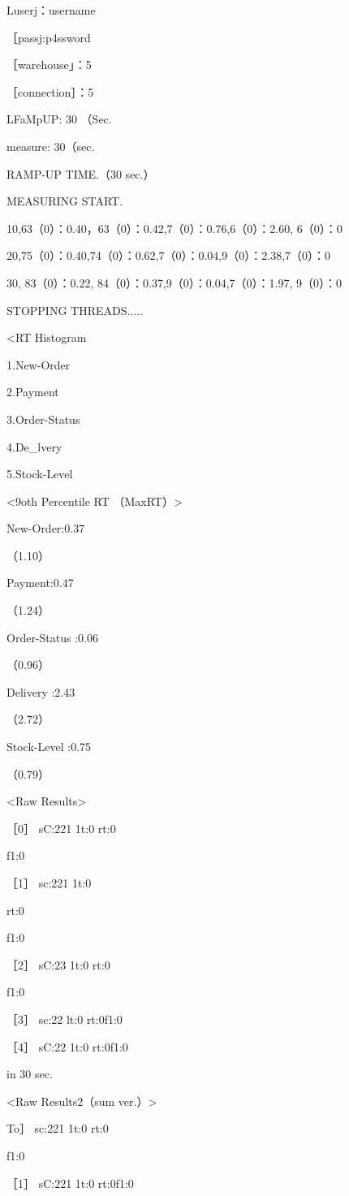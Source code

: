 Luserj：username

［passj:p4ssword

［warehouse」：5

［connection］：5

LFaMpUP: 30 （Sec.

measure: 30（sec.

RAMP-UP TIME.（30 sec.）

MEASURING START.

10,63（0）：0.40，63（0）：0.42,7（0）：0.76,6（0）：2.60, 6（0）：0

20,75（0）：0.40,74（0）：0.62,7（0）：0.04,9（0）：2.38,7（0）：0

30, 83（0）：0.22, 84（0）：0.37,9（0）：0.04,7（0）：1.97, 9（0）：0

STOPPING THREADS.....

<RT Histogram

1.New-Order

2.Payment

3.Order-Status

4.De\_lvery

5.Stock-Level

<9oth Percentile RT （MaxRT）>

New-Order:0.37

（1.10）

Payment:0.47

（1.24）

Order-Status :0.06

（0.96）

Delivery :2.43

（2.72）

Stock-Level :0.75

（0.79）

<Raw Results>

［0］ sC:221 1t:0 rt:0

f1:0

［1］ sc:221 1t:0

rt:0

f1:0

［2］ sC:23 1t:0 rt:0

f1:0

［3］ sc:22 lt:0 rt:0f1:0

［4］ sC:22 1t:0 rt:0f1:0

in 30 sec.

<Raw Results2（sum ver.）>

To］ sc:221 1t:0 rt:0

f1:0

［1］ sC:221 1t:0 rt:0f1:0

